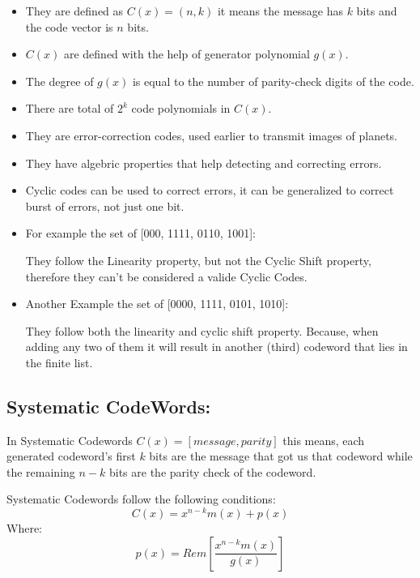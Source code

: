 \documentclass[a4paper,12pt]{report}
\begin{document}
    {\renewcommand\labelitemi{}
    \begin{itemize}
        \item They are defined as $C(x) = (n, k)$ it means the message has $k$ bits
                and the code vector is $n$ bits.
        \item $C(x)$ are defined with the help of generator polynomial $g(x)$.
        \item The degree of $g(x)$ is equal to the number of parity-check digits of the code.
        \item There are total of $2^k$ code polynomials in $C(x)$.
        \item They are error-correction codes, used earlier to transmit images of planets.
        \item They have algebric properties that help detecting and correcting errors.
        \item Cyclic codes can be used to correct errors, it can be generalized to correct
        burst of errors, not just one bit.
        \item For example the set of [000, 1111, 0110, 1001]:
                
                They follow the Linearity property, but not the Cyclic Shift property,
                therefore they can't be considered a valide Cyclic Codes.
        \item Another Example the set of [0000, 1111, 0101, 1010]:
                
                They follow both the linearity and cyclic shift property.
                Because, when adding any two of them it will result in another (third) codeword
                that lies in the finite list.
    \end{itemize}
    

    \subsection{Systematic CodeWords:}
        In Systematic Codewords $C(x) = \left[ message, parity\right]$ this means, each
        generated codeword's first $k$ bits are the message that got us that codeword
        while the remaining $n-k$ bits are the parity check of the codeword.

        Systematic Codewords follow the following conditions:
        \begin{equation*}
            C(x) = x^{n-k} m(x) + p(x)
        \end{equation*}
        Where:
        \begin{equation*}
            p(x) = Rem \left[ \frac{x^{n-k} m(x)}{g(x)} \right]
        \end{equation*}

}
\end{document}
